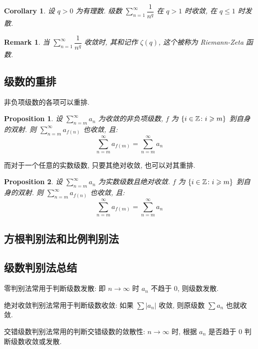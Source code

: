 \documentclass[UTF8]{ctexart}
\theoremstyle{mystyle}
\newtheorem{proposition}{Proposition}[section]
\theoremstyle{myremark}
\newtheorem*{remark}{Remark}
\theoremstyle{plain}
\newtheorem{corollary}{Corollary}[section]
\newcommand{\Z}{\mathbb Z}
\DeclarePairedDelimiter\set{\{}{\}}
\begin{document}
\begin{corollary}
    设 $ q > 0 $ 为有理数. 级数 $ \displaystyle \sum_{n = 1}^{\infty} \dfrac{1}{n^q} $ 在 $ q > 1 $ 时收敛, 在 $ q \leqslant 1 $ 时发散.
\end{corollary}

\begin{remark}
    当 $ \displaystyle \sum_{n = 1}^{\infty} \dfrac{1}{n^q} $ 收敛时, 其和记作 $ \zeta (q) $, 这个被称为 Riemann-Zeta 函数.
\end{remark}


\subsection{级数的重排}
非负项级数的各项可以重排.

\begin{proposition}
    设 $ \displaystyle \sum_{n = m}^{\infty} a_n $ 为收敛的非负项级数, $ f $ 为 $ \set{i \in \Z \colon i \geqslant m} $ 到自身的双射. 则 $ \displaystyle \sum_{n = m}^{\infty} a_{f(n)} $ 也收敛, 且:
    \[ \sum_{n = m}^{\infty} a_{f(m)} = \sum_{n = m}^{\infty} a_n \]
\end{proposition}



而对于一个任意的实数级数, 只要其绝对收敛, 也可以对其重排.

\begin{proposition}
    设 $ \displaystyle \sum_{n = m}^{\infty} a_n $ 为实数级数且绝对收敛. $ f $ 为 $ \set{i \in \Z \colon i \geqslant m} $ 到自身的双射. 则 $ \displaystyle \sum_{n = m}^{\infty} a_{f(n)} $ 也收敛, 且:
    \[ \sum_{n = m}^{\infty} a_{f(m)} = \sum_{n = m}^{\infty} a_n \]
\end{proposition}


\subsection{方根判别法和比例判别法}


\subsection{级数判别法总结}
零判别法常用于判断级数发散: 即 $ n \to \infty $ 时 $ a_n $ 不趋于 $ 0 $, 则级数发散.

绝对收敛判别法常用于判断级数收敛: 如果 $ \sum |a_n| $ 收敛, 则原级数 $ \sum a_n $ 也就收敛.

交错级数判别法常用的判断交错级数的敛散性: $ n \to \infty $ 时, 根据 $ a_n $ 是否趋于 $ 0 $ 判断级数收敛或发散.
\end{document}
